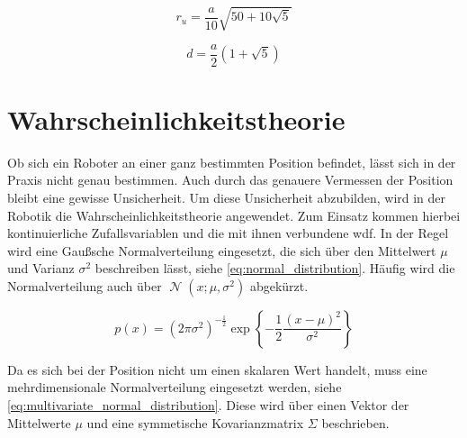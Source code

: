 \begin{equation}
r_u = \frac{a}{10} \sqrt{50 + 10 \sqrt{5}} \label{eq:fuenfeck_umkreisradius}
\end{equation}

\begin{equation}
d = \frac{a}{2} \left(1 + \sqrt{5} \right) \label{eq:fuenfeck_diagonale}
\end{equation}


%
%
\section{Wahrscheinlichkeitstheorie}

Ob sich ein Roboter an einer ganz bestimmten Position befindet, lässt sich in der Praxis nicht genau bestimmen. Auch durch das genauere Vermessen der Position bleibt eine gewisse Unsicherheit. Um diese Unsicherheit abzubilden, wird in der Robotik die Wahrscheinlichkeitstheorie angewendet. Zum Einsatz kommen hierbei kontinuierliche Zufallsvariablen und die mit ihnen verbundene \Gls{wdf}. In der Regel wird eine Gaußsche Normalverteilung eingesetzt, die sich über den Mittelwert $\mu$ und Varianz $\sigma^2$ beschreiben lässt, siehe \autoref{eq:normal_distribution}. Häufig wird die Normalverteilung auch über $\operatorname{\mathcal{N}}{(x; \mu, \sigma^2)}$ abgekürzt.

\begin{equation}
p(x) = \left( 2 \pi \sigma^2 \right)^{-\frac12}  \exp{ \left\{ -\frac12 \frac{(x - \mu)^2}{\sigma^2} \right\} } \label{eq:normal_distribution}
\end{equation}

Da es sich bei der Position nicht um einen skalaren Wert handelt, muss eine mehrdimensionale Normalverteilung eingesetzt werden, siehe \autoref{eq:multivariate_normal_distribution}. Diese wird über einen Vektor der Mittelwerte $\mu$ und eine symmetische Kovarianzmatrix $\Sigma$ beschrieben.

